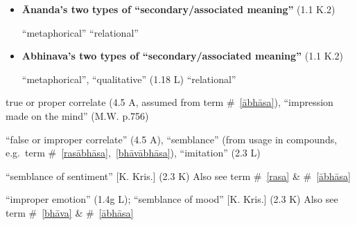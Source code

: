 \documentclass[10pt]{article}
\begin{document}
\begin{multicols}{2}
\begin{enumerate}[
			leftmargin=0em,
			rightmargin=0em,
		]

		\begin{itemize}
			\item \textbf{Ānanda's two types of ``secondary\-/associated meaning''} (1.1 K.2)
			      \begin{enumerate}
				       ``metaphorical''
				       ``relational''
			      \end{enumerate}

			\item \textbf{Abhinava's two types of ``secondary/associated meaning''} (1.1 K.2)
			      \begin{enumerate}
				       ``metaphorical'', ``qualitative'' (1.18 L)
				       ``relational''
			      \end{enumerate}
		\end{itemize}

		 true or proper correlate (4.5 A, assumed from term \#~\ref{ābhāsa}),
		``impression made on the mind'' (M.W. p.756)

		 ``false or improper correlate'' (4.5 A),
		``semblance'' (from usage in compounds, e.g.\ term \#~\ref{rasābhāsa},~\ref{bhāvābhāsa}),
		``imitation'' (2.3 L)

		 ``semblance of sentiment'' [K. Kris.] (2.3 K)
		Also see term \#~\ref{rasa} \& \#~\ref{ābhāsa}

		 ``improper emotion'' (1.4g L);
		``semblance of mood'' [K. Kris.] (2.3 K)
		Also see term \#~\ref{bhāva} \& \#~\ref{ābhāsa}


\end{enumerate}
\end{multicols}
\end{document}

